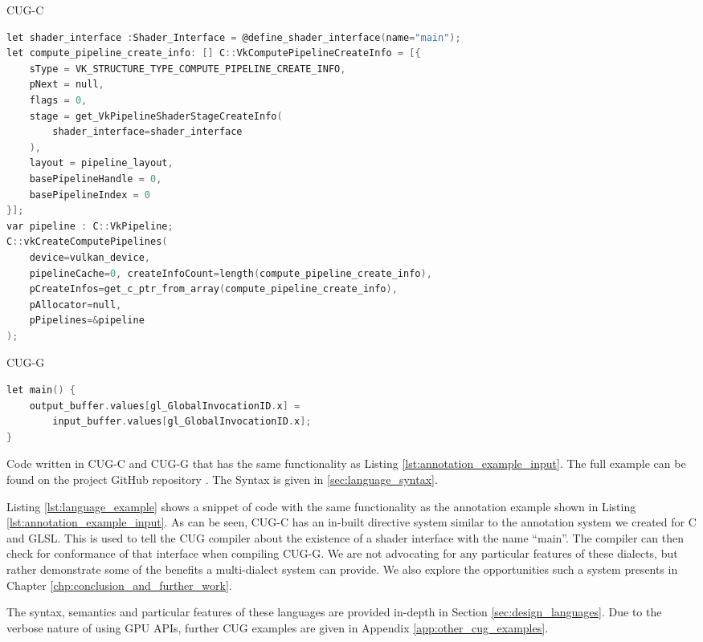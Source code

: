 \documentclass[a4paper,12pt,twoside,openright]{report}
\begin{document}
\begin{lstfloat}
\begin{center} CUG-C \end{center}
\begin{lstlisting}[language=C]
let shader_interface :Shader_Interface = @define_shader_interface(name="main");
let compute_pipeline_create_info: [] C::VkComputePipelineCreateInfo = [{
    sType = VK_STRUCTURE_TYPE_COMPUTE_PIPELINE_CREATE_INFO,
    pNext = null,
    flags = 0,
    stage = get_VkPipelineShaderStageCreateInfo(
        shader_interface=shader_interface
    ),
    layout = pipeline_layout,
    basePipelineHandle = 0,
    basePipelineIndex = 0
}];
var pipeline : C::VkPipeline;
C::vkCreateComputePipelines(
    device=vulkan_device,
    pipelineCache=0, createInfoCount=length(compute_pipeline_create_info),
    pCreateInfos=get_c_ptr_from_array(compute_pipeline_create_info),
    pAllocator=null,
    pPipelines=&pipeline
);
\end{lstlisting}
\begin{center} CUG-G \end{center}
\begin{lstlisting}[language=C]
let main() {
    output_buffer.values[gl_GlobalInvocationID.x] =
        input_buffer.values[gl_GlobalInvocationID.x];
}
\end{lstlisting}
\caption{Code written in CUG-C and CUG-G that has the same functionality as
Listing \ref{lst:annotation_example_input}. The full example can be found on
the project GitHub repository \cite{ProjectSource}. The Syntax is given in
\ref{sec:language_syntax}.}
\label{lst:language_example}
\end{lstfloat}

Listing \ref{lst:language_example} shows a snippet of code with the same
functionality as the annotation example shown in Listing
\ref{lst:annotation_example_input}. As can be seen, CUG-C has an in-built
directive system similar to the annotation system we created for C and GLSL.
This is used to tell the CUG compiler about the existence of a shader interface
with the name ``main''. The compiler can then check for conformance of that
interface when compiling CUG-G. We are not advocating for any particular
features of these dialects, but rather demonstrate some of the benefits a
multi-dialect system can provide. We also explore the opportunities such a
system presents in Chapter \ref{chp:conclusion_and_further_work}.

The syntax, semantics and particular features of these languages are provided
in-depth in Section \ref{sec:design_languages}. Due to the verbose nature of
using GPU APIs, further CUG examples are given in Appendix
\ref{app:other_cug_examples}.
\end{document}
